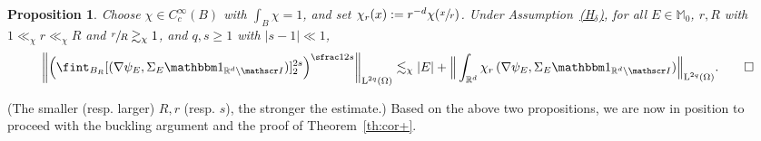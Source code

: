 \documentclass[JEP,XML,SOM,Unicode,published]{cedram}
\let\mathcal\mathscr
\newcommand{\Hd}{\hyperref[Hd]{\textup{(H$_\delta$)}}\xspace}
\let\mathds\mathbbm
\theoremstyle{plain}
\newtheorem{propo}[theor]{Proposition}
\theoremstyle{definition}
\newcommand{\R}{\mathbb R}
\newcommand{\Ic}{\mathcal I}
\newcommand{\Md}{\mathbb M}
\newcommand{\Ld}{\operatorname{L}}
\begin{document}
\begin{propo}\label{prop:interpol}
Choose \mbox{$\chi\in C^\infty_c(B)$} with $\int_B\chi=1$, and set $\chi_r(x):=r^{-d}\chi(\sfrac xr)$.
Under Assumption~\Hd, for all $E\in\Md_0$, $r,R$ with $1\ll_\chi r\ll_\chi R$ and $\sfrac rR\gtrsim_\chi1$, and \hbox{$q,s\ge1$} with $|s-1|\ll1$,
\[\bigg\|\Big(\fint_{B_{R}}[(\nabla\psi_E,\Sigma_E\mathds1_{\R^d\setminus\Ic})]_2^{2s}\Big)^{\sfrac1{2s}}\bigg\|_{\Ld^{2q}(\Omega)}\lesssim_\chi |E|+\Big\|\int_{\R^d}\chi_r\,(\nabla\psi_E,\Sigma_E\mathds1_{\R^d\setminus\Ic})\Big\|_{\Ld^{2q}(\Omega)}.\qedhere\]
\end{propo}
(The smaller (resp. larger) $R,r$ (resp. $s$), the stronger the estimate.)
Based on the above two propositions, we are now in position to proceed with the buckling argument and the proof of Theorem~\ref{th:cor+}.
\end{document}
